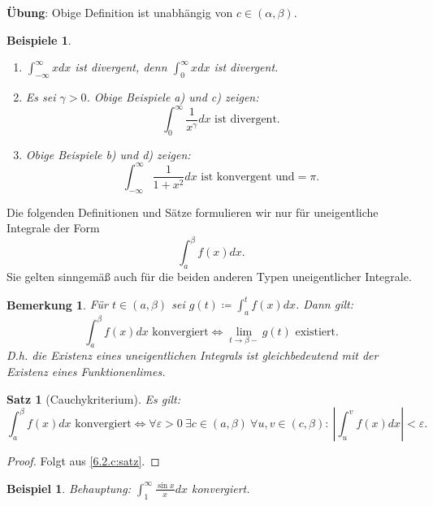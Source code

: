 \documentclass[12pt]{extreport} %
\theoremstyle{named}
\theoremstyle{itshape}
\newtheorem{satz}[unnamedtheorem]{Satz}
\theoremstyle{normal}
\newtheorem*{beispiel*}{Beispiel}
\newtheorem*{beispiele}{Beispiele}
\newtheorem*{bemerkung}{Bemerkung}
\begin{document}
{\textbf{Übung}: Obige Definition ist unabhängig von $c \in (\alpha, \beta)$.

\begin{beispiele} ~\
	\begin{enumerate}
		\item $\int_{-\infty}^{\infty} x dx$ ist divergent, denn $\int_{0}^{\infty} x dx$ ist divergent. 
		\item Es sei $\gamma > 0$. Obige Beispiele a) und c) zeigen:
			$$ \int_{0}^{\infty} \frac{1}{x^{\gamma}} dx \text{ ist divergent.} $$
		\item Obige Beispiele b) und d) zeigen:
			$$ \int_{-\infty}^{\infty} \frac{1}{1 + x^{2}} dx \text{ ist konvergent und} = \pi. $$
	\end{enumerate}
\end{beispiele}

Die folgenden Definitionen und Sätze formulieren wir nur für uneigentliche Integrale der Form
	$$ \int_{a}^{\beta} f(x) dx. $$
Sie gelten sinngemä{\ss} auch für die beiden anderen Typen uneigentlicher Integrale.

\begin{bemerkung}
Für $t \in (a, \beta)$ sei $g(t) \coloneqq \int_{a}^{t} f(x) dx$. Dann gilt:
	$$ \int_{a}^{\beta} f(x) dx \text{ konvergiert} \iff \lim_{t \rightarrow \beta-} g(t) \text{ existiert.} $$
D.h. die Existenz eines uneigentlichen Integrals ist gleichbedeutend mit der Existenz eines Funktionenlimes.
\end{bemerkung}
	

\begin{satz}[Cauchykriterium] \label{11.1:prop-Cauchykriterium}
	Es gilt: 
	$$\int_{a}^{\beta} f(x) dx \text{ konvergiert} \iff 
	\forall \varepsilon > 0 ~\exists c \in (a, \beta) ~ \forall u, v \in (c, \beta): ~ \left| \int_{u}^{v} f(x) dx \right| < \varepsilon.  $$
\end{satz}

\begin{proof}
Folgt aus \ref{6.2.c:satz}.
\end{proof}


\begin{beispiel*}
	Behauptung: $\int_{1}^{\infty} \frac{\sin x}{x} dx$ konvergiert.	
\end{beispiel*}

}
\end{document}

